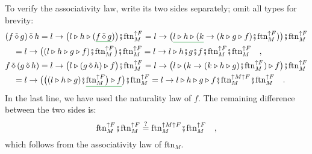 To verify the associativity law, write its two sides separately; omit
all types for brevity:
\begin{align*}
 & (f\,\tilde{\diamond}\,g)\,\tilde{\diamond}\,h=l\rightarrow\big(l\triangleright h\triangleright(\gunderline{f\,\tilde{\diamond}\,g})\big)\bef\text{ftn}_{M}^{\uparrow F}=l\rightarrow\big(\gunderline{l\triangleright h\triangleright(k}\rightarrow(k\triangleright g\triangleright f)\bef\text{ftn}_{M}^{\uparrow F})\big)\bef\text{ftn}_{M}^{\uparrow F}\\
 & \quad=l\rightarrow\big((l\triangleright h\triangleright g\triangleright f)\bef\text{ftn}_{M}^{\uparrow F}\big)\bef\text{ftn}_{M}^{\uparrow F}=l\rightarrow l\triangleright h\bef g\bef f\bef\text{ftn}_{M}^{\uparrow F}\bef\text{ftn}_{M}^{\uparrow F}\quad,\\
 & f\,\tilde{\diamond}\,(g\,\tilde{\diamond}\,h)=l\rightarrow\big(l\triangleright(g\,\tilde{\diamond}\,h)\triangleright f\big)\bef\text{ftn}_{M}^{\uparrow F}=l\rightarrow\big(l\triangleright(k\rightarrow(k\triangleright h\triangleright g)\bef\text{ftn}_{M}^{\uparrow F})\triangleright f\big)\bef\text{ftn}_{M}^{\uparrow F}\\
 & \quad=l\rightarrow\big(\big((l\triangleright h\triangleright g)\bef\gunderline{\text{ftn}_{M}^{\uparrow F}\big)\triangleright f}\big)\bef\text{ftn}_{M}^{\uparrow F}=l\rightarrow l\triangleright h\triangleright g\triangleright f\bef\text{ftn}_{M}^{\uparrow M\uparrow F}\bef\text{ftn}_{M}^{\uparrow F}\quad.
\end{align*}
In the last line, we have used the naturality law of $f$. The remaining
difference between the two sides is:
\[
\text{ftn}_{M}^{\uparrow F}\bef\text{ftn}_{M}^{\uparrow F}\overset{?}{=}\text{ftn}_{M}^{\uparrow M\uparrow F}\bef\text{ftn}_{M}^{\uparrow F}\quad,
\]
which follows from the associativity law of $\text{ftn}_{M}$.


